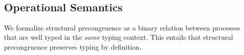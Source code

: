 \begin{code}[hide]
\AgdaSpace{}%
\AgdaSymbol{)}\AgdaSpace{}%
\AgdaSpace{}%
\AgdaSpace{}%
\AgdaSpace{}%
\<%
\\
\>[0]\AgdaSpace{}%
\AgdaSymbol{|}\AgdaSpace{}%
\AgdaSpace{}%
\AgdaOperator{\AgdaInductiveConstructor{,}}\AgdaSpace{}%
\AgdaSpace{}%
\AgdaOperator{\AgdaInductiveConstructor{,}}\AgdaSpace{}%
\AgdaSpace{}%
\AgdaSymbol{=}\AgdaSpace{}%
\AgdaSpace{}%
\AgdaSpace{}%
\AgdaSymbol{(}\AgdaSpace{}%
\AgdaSymbol{(}\AgdaSpace{}%
\AgdaSymbol{(}\AgdaSpace{}%
\AgdaSymbol{))}\AgdaSpace{}%
\AgdaSymbol{)}\<%
\end{code}

\subsection{Operational Semantics}
\label{sec:semantics-agda}

We formalize structural precongruence as a binary relation between processes
that are well typed in the \emph{same} typing context. This entails that
structural precongruence preserves typing by definition.

